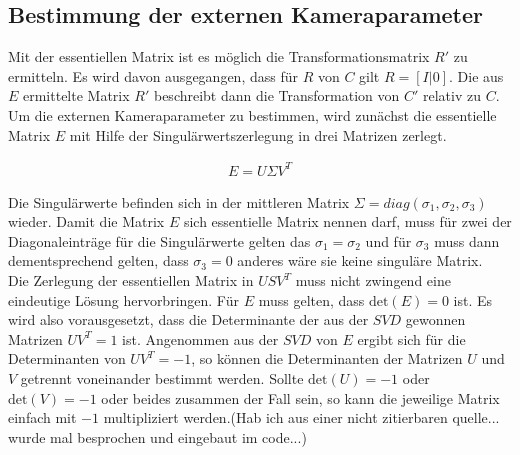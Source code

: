 \subsection{Bestimmung der externen Kameraparameter}


Mit der essentiellen Matrix ist es möglich die Transformationsmatrix $R'$ zu ermitteln. Es wird davon ausgegangen, dass für $R$ von $C$ gilt $R = [I|0]$. Die aus $E$ ermittelte Matrix $R'$ beschreibt dann die Transformation von $C'$ relativ zu $C$\cite{HZ,Ferid}. Um die externen Kameraparameter zu bestimmen, wird zunächst die essentielle Matrix \ensuremath{E} mit Hilfe der Singulärwertszerlegung in drei Matrizen zerlegt. 

\begin{gather}
E = U\Sigma V^T
\end{gather}

Die Singulärwerte befinden sich in der mittleren Matrix $\Sigma = diag(\sigma_1,\sigma_2,\sigma_3)$ wieder. Damit die Matrix $E$ sich essentielle Matrix nennen darf, muss für zwei der Diagonaleinträge für die Singulärwerte gelten das $\sigma_1 = \sigma_2$ und für $\sigma_3$ muss dann dementsprechend gelten, dass $\sigma_3=0$ anderes wäre sie keine singuläre Matrix.\\ 



Die Zerlegung der essentiellen Matrix in $USV^T$ muss nicht zwingend eine eindeutige Lösung hervorbringen. Für $E$ muss gelten, dass $\text{det}(E) = 0$ ist. Es wird also vorausgesetzt, dass die Determinante der aus der $SVD$ gewonnen Matrizen $UV^T = 1$ ist. Angenommen aus der $SVD$ von $E$ ergibt sich für die Determinanten von $UV^T = -1$, so können die Determinanten der Matrizen $U$ und $V$ getrennt voneinander bestimmt werden. Sollte $\text{det}(U)=-1$ oder $\text{det}(V)=-1$ oder beides zusammen der Fall sein, so kann die jeweilige Matrix einfach mit $-1$ multipliziert werden.(Hab ich aus einer nicht zitierbaren quelle... wurde mal besprochen und eingebaut im code...)\\

